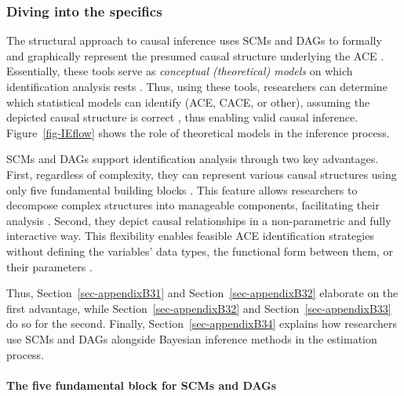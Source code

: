\documentclass[
  authoryear,
  review,
  1p]{elsarticle}
\let\oldparagraph\paragraph
\renewcommand{\paragraph}[1]{\oldparagraph{#1}\mbox{}}
\begin{document}
\subsubsection{Diving into the specifics}\label{sec-appendixB3}

The structural approach to causal inference uses SCMs and DAGs to
formally and graphically represent the presumed causal structure
underlying the ACE
\citep{Pearl_2009, Pearl_et_al_2016, Gross_et_al_2018, Neal_2020}.
Essentially, these tools serve as \emph{conceptual (theoretical) models}
on which identification analysis rests
\citep[p.~4]{Schuessler_et_al_2023}. Thus, using these tools,
researchers can determine which statistical models can identify (ACE,
CACE, or other), assuming the depicted causal structure is correct
\citep{McElreath_2020}, thus enabling valid causal inference.
Figure~\ref{fig-IEflow} shows the role of theoretical models in the
inference process.

SCMs and DAGs support identification analysis through two key
advantages. First, regardless of complexity, they can represent various
causal structures using only five fundamental building blocks
\citep{Neal_2020, McElreath_2020}. This feature allows researchers to
decompose complex structures into manageable components, facilitating
their analysis \citep{McElreath_2020}. Second, they depict causal
relationships in a non-parametric and fully interactive way. This
flexibility enables feasible ACE identification strategies without
defining the variables' data types, the functional form between them, or
their parameters \citep[p.~35]{Pearl_et_al_2016}.

Thus, Section~\ref{sec-appendixB31} and Section~\ref{sec-appendixB32}
elaborate on the first advantage, while Section~\ref{sec-appendixB32}
and Section~\ref{sec-appendixB33} do so for the second. Finally,
Section~\ref{sec-appendixB34} explains how researchers use SCMs and DAGs
alongside Bayesian inference methods in the estimation process.

\paragraph{The five fundamental block for SCMs and
DAGs}\label{sec-appendixB31}
\end{document}
